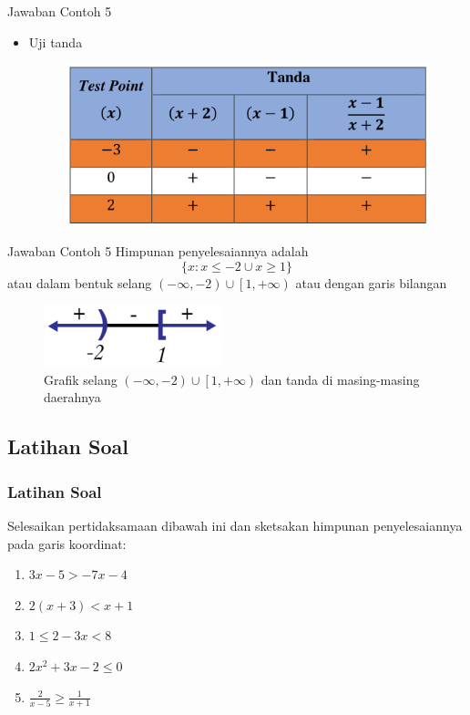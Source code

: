 \documentclass[pdflatex,compress,mathserif]{beamer}
\begin{document}
		\begin{frame}{Jawaban Contoh 5}
			\begin{itemize}
				\item Uji tanda
				\begin{figure}
					\centering
					\includegraphics[width=0.7\linewidth]{pict/17}
				\end{figure}
			\end{itemize}
		\end{frame}
		
		\begin{frame}{Jawaban Contoh 5}
			Himpunan penyelesaiannya adalah
			$$ \{x: x \leq -2 \cup x \geq 1\} $$
			atau dalam bentuk selang $ \left(-\infty,-2 \right) \cup \left[ 1,+\infty \right) $ atau dengan garis bilangan
			\begin{figure}
				\centering
				\includegraphics[width=0.3\linewidth]{pict/18}
				\caption{Grafik selang $ \left(-\infty,-2 \right) \cup \left[ 1,+\infty \right) $ dan tanda di masing-masing daerahnya}
				\label{fig:18}
			\end{figure}
		\end{frame}
	
	\subsection{Latihan Soal}
	
	\begin{frame}
		\frametitle{Latihan Soal}
		Selesaikan pertidaksamaan dibawah ini dan sketsakan himpunan penyelesaiannya pada garis koordinat:
		\begin{enumerate}
			\item $ 3x - 5 > -7x -4 $
			\item $ 2(x+3) < x + 1 $
			\item $ 1 \leq 2 - 3x < 8 $
			\item $ 2x^2 + 3x - 2 \leq 0 $
			\item $ \frac{2}{x - 5} \geq \frac{1}{x + 1}$
		\end{enumerate}
	\end{frame}
	
\end{document}

